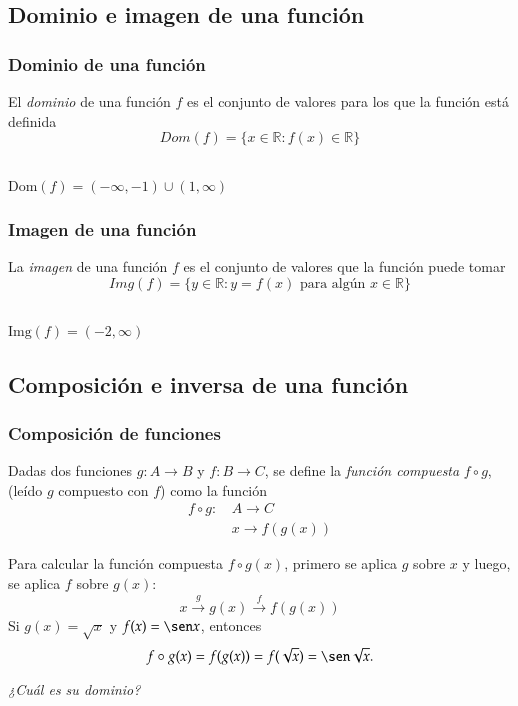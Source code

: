 \subsection{Dominio e imagen de una función}
\begin{frame}
\frametitle{Dominio de una función}
\begin{definicion}
El \emph{dominio} de una función $f$ es el conjunto de valores para los que la función está definida
\[
Dom(f)=\{x\in \mathbb{R}: f(x)\in \mathbb{R}\}
\]
\end{definicion}
\begin{center}
\scalebox{1}{}\\
$\mbox{Dom}(f)=(-\infty,-1)\cup(1,\infty)$
\end{center}
\end{frame} 


\begin{frame}
\frametitle{Imagen de una función}
\begin{definicion}
La \emph{imagen} de una función $f$ es el conjunto de valores que la función puede tomar
\[
Img(f)=\{y\in \mathbb{R}: y=f(x) \mbox{ para algún } x\in\mathbb{R}\}
\]
\end{definicion}
\begin{center}
\scalebox{1}{}\\
$\mbox{Img}(f)=(-2,\infty)$
\end{center}
\end{frame} 



\subsection{Composición e inversa de una función}
\begin{frame}
\frametitle{Composición de funciones}
\begin{definicion}
Dadas dos funciones $g:A\rightarrow B$ y $f:B\rightarrow C$, se define la \emph{función compuesta} $f\circ g$, (leído $g$ compuesto con $f$) como la función  
\begin{align*}
f\circ g:\,& A\longrightarrow C\\
& x\longrightarrow f(g(x))
\end{align*}
\end{definicion}
Para calcular la función compuesta $f\circ g(x)$, primero se aplica $g$ sobre $x$ y luego, se aplica $f$ sobre $g(x)$:
\[
x\stackrel{g}{\longrightarrow}g(x)\stackrel{f}{\longrightarrow}f(g(x))
\]
 Si $g(x)=\sqrt x$ y $f(x)=\sen x$, entonces 
\[
f\circ g(x)=f(g(x))=f(\sqrt x)=\sen \sqrt x.
\]
\begin{center}
\emph{¿Cuál es su dominio?}
\end{center}
\end{frame} 


